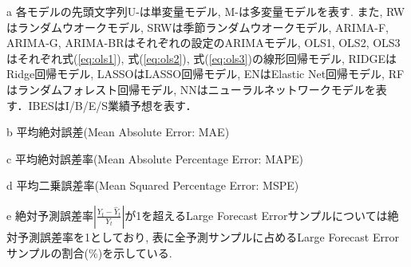 \begin{threeparttable}[h]
\begin{tablenotes}
\item[a] 各モデルの先頭文字列U-は単変量モデル, M-は多変量モデルを表す. また, RWはランダムウオークモデル, SRWは季節ランダムウオークモデル, ARIMA-F, ARIMA-G, ARIMA-BRはそれぞれ\cite*{foster1977quarterly, griffin1977time, brown1979univariate}の設定のARIMAモデル, OLS1, OLS2, OLS3はそれぞれ式(\ref{eq:ols1}), 式(\ref{eq:ols2}), 式(\ref{eq:ols3})の線形回帰モデル, RIDGEはRidge回帰モデル, LASSOはLASSO回帰モデル, ENはElastic Net回帰モデル, RFはランダムフォレスト回帰モデル, NNはニューラルネットワークモデルを表す．IBESはI/B/E/S業績予想を表す．
\item[b] 平均絶対誤差(Mean Absolute Error: MAE)
\item[c] 平均絶対誤差率(Mean Absolute Percentage Error: MAPE)
\item[d] 平均二乗誤差率(Mean Squared Percentage Error: MSPE)
\item[e] 絶対予測誤差率$\left| \frac{Y_t -{\hat Y}_t}{Y_t} \right|$が1を超えるLarge Forecast Errorサンプルについては絶対予測誤差率を1としており, 表に全予測サンプルに占めるLarge Forecast Errorサンプルの割合(\%)を示している.
\end{tablenotes}
\end{threeparttable}  